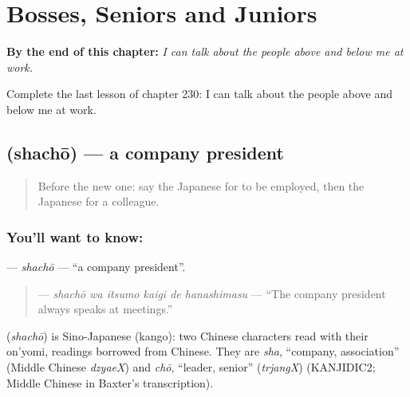 
\chapter{Bosses, Seniors and Juniors}
\label{ch:ja-bosses-seniors-and-juniors}

\begin{chapteropening}
\textbf{By the end of this chapter:} \emph{I can talk about the people above and below me at work.}

Complete the last lesson of chapter 230: I can talk about the people above and below me at work.
\end{chapteropening}

\section[\texorpdfstring{\ja{しゃちょう} (shachō)}{しゃちょう (shachō)}]{ (shachō) — a company president}

\label{lesson:JA-C230-shachou}



\begin{quote}
Before the new one: say the Japanese for to be employed, then the Japanese for a colleague.
\end{quote}

\subsection*{You'll want to know: }
\textbf{} — \emph{shachō} — \textquotedblleft{}a company president\textquotedblright{}.

\begin{quote}
\textbf{   } — \emph{shachō wa itsumo kaigi de hanashimasu} — \textquotedblleft{}The company president always speaks at meetings.\textquotedblright{}
\end{quote}

\begin{cousinweb}
\textbf{} (\emph{shachō}) is Sino-Japanese (kango): two Chinese characters read with their on'yomi, readings borrowed from Chinese. They are \emph{sha}, \textquotedblleft{}company, association\textquotedblright{} (Middle Chinese \emph{dzyaeX}) and \emph{chō}, \textquotedblleft{}leader, senior\textquotedblright{} (\emph{trjangX}) (KANJIDIC2; Middle Chinese in Baxter's transcription).
\end{cousinweb}

